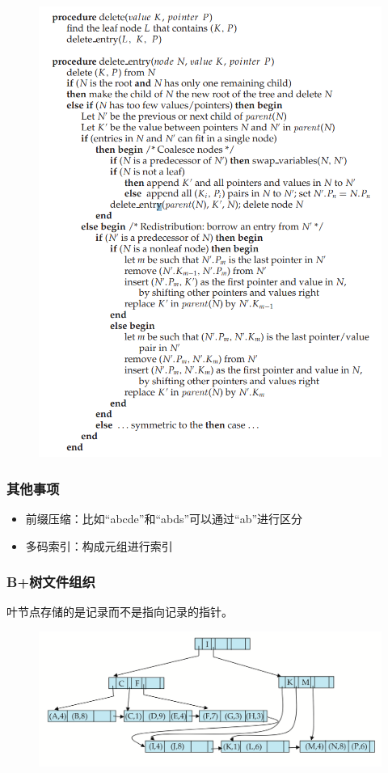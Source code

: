 \begin{figure}[H]
\centering
\includegraphics[width=0.7\linewidth]{fig/bp-tree_deletion_alg.png}
\end{figure}

\subsubsection{其他事项}
\begin{itemize}
	\item 前缀压缩：比如``abcde''和``abds''可以通过``ab''进行区分
	\item 多码索引：构成元组进行索引
\end{itemize}

\subsubsection{B+树文件组织}
叶节点存储的是记录而不是指向记录的指针。
\begin{figure}[H]
\centering
\includegraphics[width=0.8\linewidth]{fig/bp-tree_file_organization.png}
\end{figure}

